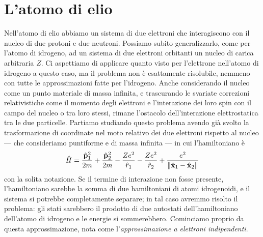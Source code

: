 \section{L'atomo di elio}
Nell'atomo di elio abbiamo un sistema di due elettroni che interagiscono con il nucleo di due protoni e due neutroni.
Possiamo subito generalizzarlo, come per l'atomo di idrogeno, ad un sistema di due elettroni orbitanti un nucleo di carica arbitraria $Z$.
Ci aspettiamo di applicare quanto visto per l'elettrone nell'atomo di idrogeno a questo caso, ma il problema non è esattamente risolubile, nemmeno con tutte le approssimazioni fatte per l'idrogeno.
Anche considerando il nucleo come un punto materiale di massa infinita, e trascurando le svariate correzioni relativistiche come il momento degli elettroni e l'interazione dei loro spin con il campo del nucleo o tra loro stessi, rimane l'ostacolo dell'interazione elettrostatica tra le due particelle.
Partiamo studiando questo problema avendo già svolto la trasformazione di coordinate nel moto relativo dei due elettroni rispetto al nucleo --- che consideriamo puntiforme e di massa infinita --- in cui l'hamiltoniano è
\begin{equation}
    \hat{H}=\frac{\hat{\mathbf{p}}_1^2}{2m}+\frac{\hat{\mathbf{p}}_2^2}{2m}-\frac{Ze^2}{\hat{r}_1}-\frac{Ze^2}{\hat{r}_2}+\frac{e^2}{\lVert\hat{\mathbf{x}}_1-\hat{\mathbf{x}}_2\rVert}
    \label{eq:H-elio}
\end{equation}
con la solita notazione.
Se il termine di interazione non fosse presente, l'hamiltoniano sarebbe la somma di due hamiltoniani di atomi idrogenoidi, e il sistema si potrebbe completamente separare; in tal caso avremmo risolto il problema: gli stati sarebbero il prodotto di due autostati dell'hamiltoniano dell'atomo di idrogeno e le energie si sommerebbero.
Cominciamo proprio da questa approssimazione, nota come l'\emph{approssimazione a elettroni indipendenti}.

